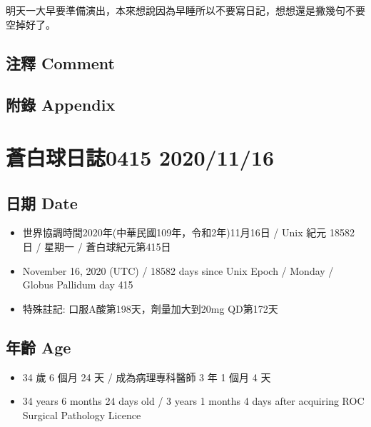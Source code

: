 \documentclass[a5paper, 11pt
]{book}
\providecommand{\tightlist}{%
  \setlength{\itemsep}{0pt}\setlength{\parskip}{0pt}}
\begin{document}
明天一大早要準備演出，本來想說因為早睡所以不要寫日記，想想還是撇幾句不要空掉好了。

\hypertarget{ux6ce8ux91cb-comment-69}{%
\subsection{注釋 Comment}\label{ux6ce8ux91cb-comment-69}}

\hypertarget{ux9644ux9304-appendix-69}{%
\subsection{附錄 Appendix}\label{ux9644ux9304-appendix-69}}

\hypertarget{ux84bcux767dux7403ux65e5ux8a8c0415-20201116}{%
\section{蒼白球日誌0415
2020/11/16}\label{ux84bcux767dux7403ux65e5ux8a8c0415-20201116}}

\hypertarget{ux65e5ux671f-date-70}{%
\subsection{日期 Date}\label{ux65e5ux671f-date-70}}

\begin{itemize}
\tightlist
\item
  世界協調時間2020年(中華民國109年，令和2年)11月16日 / Unix 紀元 18582
  日 / 星期一 / 蒼白球紀元第415日
\item
  November 16, 2020 (UTC) / 18582 days since Unix Epoch / Monday /
  Globus Pallidum day 415
\item
  特殊註記: 口服A酸第198天，劑量加大到20mg QD第172天
\end{itemize}

\hypertarget{ux5e74ux9f61-age-70}{%
\subsection{年齡 Age}\label{ux5e74ux9f61-age-70}}

\begin{itemize}
\tightlist
\item
  34 歲 6 個月 24 天 / 成為病理專科醫師 3 年 1 個月 4 天
\item
  34 years 6 months 24 days old / 3 years 1 months 4 days after
  acquiring ROC Surgical Pathology Licence
\end{itemize}
\end{document}

